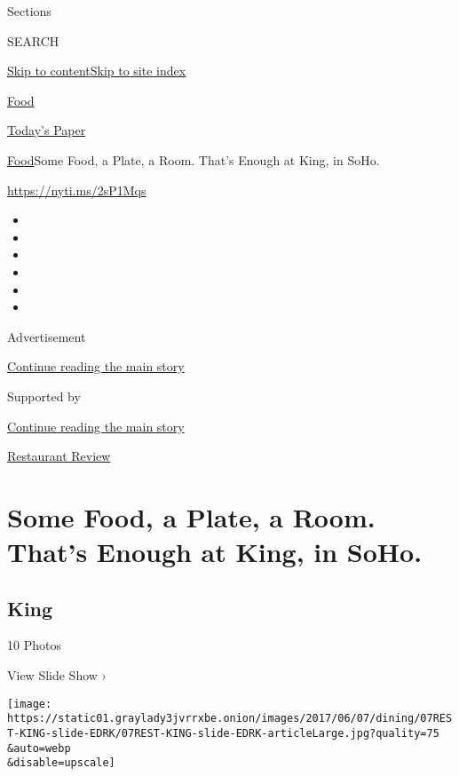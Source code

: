 Sections

SEARCH

\protect\hyperlink{site-content}{Skip to
content}\protect\hyperlink{site-index}{Skip to site index}

\href{https://www.nytimes3xbfgragh.onion/section/food}{Food}

\href{https://myaccount.nytimes3xbfgragh.onion/auth/login?response_type=cookie\&client_id=vi}{}

\href{https://www.nytimes3xbfgragh.onion/section/todayspaper}{Today's
Paper}

\href{/section/food}{Food}\textbar{}Some Food, a Plate, a Room. That's
Enough at King, in SoHo.

\url{https://nyti.ms/2sP1Mqs}

\begin{itemize}
\item
\item
\item
\item
\item
\item
\end{itemize}

Advertisement

\protect\hyperlink{after-top}{Continue reading the main story}

Supported by

\protect\hyperlink{after-sponsor}{Continue reading the main story}

\href{/column/restaurant-review}{Restaurant Review}

\hypertarget{some-food-a-plate-a-room-thats-enough-at-king-in-soho}{%
\section{Some Food, a Plate, a Room. That's Enough at King, in
SoHo.}\label{some-food-a-plate-a-room-thats-enough-at-king-in-soho}}

\href{https://www.nytimes3xbfgragh.onion/slideshow/2017/06/06/dining/king-restaurant-nyc-review.html}{}

\hypertarget{king}{%
\subsection{King}\label{king}}

10 Photos

View Slide Show ›

\texttt{[image: https://static01.graylady3jvrrxbe.onion/images/2017/06/07/dining/07REST-KING-slide-EDRK/07REST-KING-slide-EDRK-articleLarge.jpg?quality=75\\\&auto=webp\\\&disable=upscale]}

